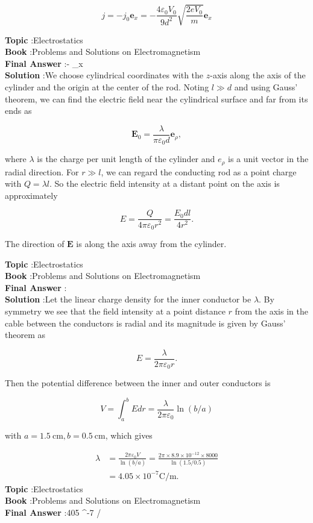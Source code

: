 \documentclass[10pt]{article}
\begin{document}
$$
j=-j_{0} \mathbf{e}_{x}=-\frac{4 \varepsilon_{0} V_{0}}{9 d^{2}} \sqrt{\frac{2 e V_{0}}{m}} \mathbf{e}_{x}
$$


\textbf{Topic} :Electrostatics\\
\textbf{Book} :Problems and Solutions on Electromagnetism\\
\textbf{Final Answer} :-  _{x}\\


\textbf{Solution} :We choose cylindrical coordinates with the $z$-axis along the axis of the cylinder and the origin at the center of the rod. Noting $l \gg d$ and using Gauss' theorem, we can find the electric field near the cylindrical surface and far from its ends as

$$
\mathbf{E}_{0}=\frac{\lambda}{\pi \varepsilon_{0} d} \mathbf{e}_{\rho},
$$

where $\lambda$ is the charge per unit length of the cylinder and $e_{\rho}$ is a unit vector in the radial direction. For $r \gg l$, we can regard the conducting rod as a point charge with $Q=\lambda l$. So the electric field intensity at a distant point on the axis is approximately

$$
E=\frac{Q}{4 \pi \varepsilon_{0} r^{2}}=\frac{E_{0} d l}{4 r^{2}} .
$$

The direction of $\mathbf{E}$ is along the axis away from the cylinder.

\textbf{Topic} :Electrostatics\\
\textbf{Book} :Problems and Solutions on Electromagnetism\\
\textbf{Final Answer} :\\


\textbf{Solution} :Let the linear charge density for the inner conductor be $\lambda$. By symmetry we see that the field intensity at a point distance $r$ from the axis in the cable between the conductors is radial and its magnitude is given by Gauss' theorem as

$$
E=\frac{\lambda}{2 \pi \varepsilon_{0} r} .
$$

Then the potential difference between the inner and outer conductors is

$$
V=\int_{a}^{b} E d r=\frac{\lambda}{2 \pi \varepsilon_{0}} \ln (b / a)
$$

with $a=1.5 \mathrm{~cm}, b=0.5 \mathrm{~cm}$, which gives

$$
\begin{aligned}
\lambda &=\frac{2 \pi \varepsilon_{0} V}{\ln (b / a)}=\frac{2 \pi \times 8.9 \times 10^{-12} \times 8000}{\ln (1.5 / 0.5)} \\
&=4.05 \times 10^{-7} \mathrm{C} / \mathrm{m} .
\end{aligned}
$$
\textbf{Topic} :Electrostatics\\
\textbf{Book} :Problems and Solutions on Electromagnetism\\
\textbf{Final Answer} :405 ^{-7}  / \\
\end{document}
